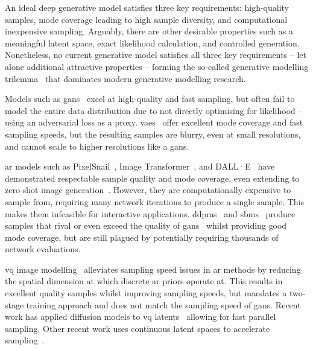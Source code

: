 An ideal deep generative model satisfies three key requirements: high-quality
samples, mode coverage leading to high sample diversity, and computational
inexpensive sampling. Arguably, there are other desirable properties such as a
meaningful latent space, exact likelihood calculation, and controlled
generation. Nonetheless, no current generative model satisfies all three key
requirements -- let alone additional attractive properties -- forming the
so-called generative modelling trilemma~\cite{xiao2021trilemma} that dominates
modern generative modelling research.

Models such as \glspl{gan}~\cite{goodfellow2014gan} excel at high-quality and
fast sampling, but often fail to model the entire data distribution due to not
directly optimising for likelihood -- using an adversarial loss as a proxy.
\Glspl{vae}~\cite{kingma2013vae} offer excellent mode coverage and fast sampling
speeds, but the resulting samples are blurry, even at small resolutions, and
cannot scale to higher resolutions like a \glspl{gan}.

\Gls{ar} models such as PixelSnail~\cite{chen2017snail}, Image
Transformer~\cite{parmar2018image}, and DALL·E~\cite{parmar2018image} have
demonstrated respectable sample quality and mode coverage, even extending to
zero-shot image generation~\cite{ramesh2021dalle}. However, they are
computationally expensive to sample from, requiring many network iterations to
produce a single sample. This makes them infeasible for interactive
applications. \Glspl{ddpm}~\cite{ho2020ddpm} and
\glspl{sbm}~\cite{song2019sbm,song2020sde,song2021mlt} produce samples that
rival or even exceed the quality of \glspl{gan}~\cite{dhariwal2021ddpm} whilst
providing good mode coverage, but are still plagued by potentially
requiring thousands of network evaluations.

\Gls{vq} image
modelling~\cite{oord2017vqvae,razavi2019generating,esser2021taming} alleviates
sampling speed issues in \gls{ar} methods by reducing the spatial dimension at
which discrete \gls{ar} priors operate at. This results in excellent quality
samples whilst improving sampling speeds, but mandates a two-stage training
approach and does not match the sampling speed of \glspl{gan}. Recent work has
applied diffusion models to \gls{vq} latents~\cite{bondtaylor2021unleashing}
allowing for fast parallel sampling. Other recent work uses continuous latent
spaces to accelerate sampling~\cite{xiao2021trilemma,vahdat2021sbmlatent}.

